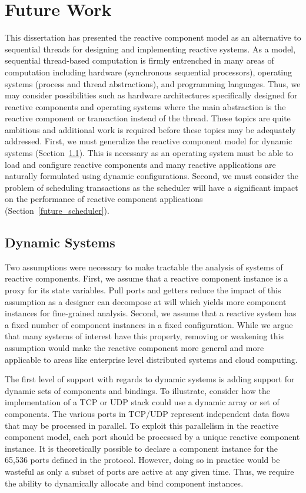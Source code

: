 \section{Future Work}

This dissertation has presented the reactive component model as an alternative to sequential threads for designing and implementing reactive systems.
As a model, sequential thread-based computation is firmly entrenched in many areas of computation including hardware (synchronous sequential processors), operating systems (process and thread abstractions), and programming languages.
Thus, we may consider possibilities such as hardware architectures specifically designed for reactive components and operating systems where the main abstraction is the reactive component or transaction instead of the thread.
These topics are quite ambitious and additional work is required before these topics may be adequately addressed.
First, we must generalize the reactive component model for dynamic systems (Section~\ref{dynamic_systems}).
This is necessary as an operating system must be able to load and configure reactive components and many reactive applications are naturally formulated using dynamic configurations.
Second, we must consider the problem of scheduling transactions as the scheduler will have a significant impact on the performance of reactive component applications (Section~\ref{future_scheduler}).

\subsection{Dynamic Systems}
\label{dynamic_systems}
Two assumptions were necessary to make tractable the analysis of systems of reactive components.
First, we assume that a reactive component instance is a proxy for its state variables.
Pull ports and getters reduce the impact of this assumption as a designer can decompose at will which yields more component instances for fine-grained analysis.
Second, we assume that a reactive system has a fixed number of component instances in a fixed configuration.
While we argue that many systems of interest have this property, removing or weakening this assumption would make the reactive component more general and more applicable to areas like enterprise level distributed systems and cloud computing.

The first level of support with regards to dynamic systems is adding support for dynamic sets of components and bindings.
To illustrate, consider how the implementation of a TCP or UDP stack could use a dynamic array or set of components.
The various ports in TCP/UDP represent independent data flows that may be processed in parallel.
To exploit this parallelism in the reactive component model, each port should be processed by a unique reactive component instance.
It is theoretically possible to declare a component instance for the 65,536 ports defined in the protocol.
However, doing so in practice would be wasteful as only a subset of ports are active at any given time.
Thus, we require the ability to dynamically allocate and bind component instances.

